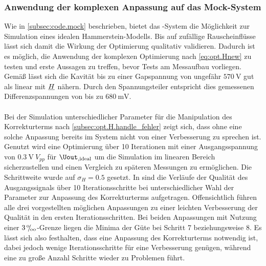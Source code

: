 \documentclass[../Report.tex]{subfiles}
\begin{document}
\subsubsection{Anwendung der komplexen Anpassung auf das Mock-System}
\label{subsubsec:opt.H.mock_simulation}

Wie in \ref{subsec:code.mock} beschrieben, bietet das \mock-System die Möglichkeit zur Simulation eines idealen Hammerstein-Modells. Bis auf zufällige Rauscheinflüsse lässt sich damit die Wirkung der Optimierung qualitativ validieren.
Dadurch ist es möglich, die Anwendung der komplexen Optimierung nach \eqref{eq:opt.Hnew} zu testen und erste Aussagen zu treffen, bevor Tests am Messaufbau vorliegen.
Gemäß \cite{gross17} lässt sich die Kavität bis zu einer Gapspannung von ungefähr $\SI{570}{\volt}$ gut als linear mit $\underline{H}$ nähern. Durch den Spannungsteiler entspricht dies gemessenen Differenzspannungen von bis zu $\SI{680}{\milli\volt}$.
\\
\\
Bei der Simulation unterschiedlicher Parameter für die Manipulation des Korrekturterms nach \ref{subsec:opt.H.handle_fehler} zeigt sich, dass ohne eine solche Anpassung bereits im \mock System nicht von einer Verbesserung zu sprechen ist.
Genutzt wird eine Optimierung über 10 Iterationen mit einer Ausgangsspannung von $\SI{0.3}{\volt} ~ V_{pp}$ für $\Uout_{, \mathrm{ideal}}$ um die Simulation im linearen Bereich sicherzustellen und einen Vergleich zu späteren Messungen zu ermöglichen. Die Schrittweite wurde auf $\sigma_H = 0.5$ gesetzt.
In  sind die Verläufe der Qualität des Ausgangssignals über 10 Iterationsschritte bei unterschiedlicher Wahl der Parameter zur Anpassung des Korrekturterms aufgetragen. Offensichtlich führen alle drei vorgestellten möglichen Anpassungen zu einer leichten Verbesserung der Qualität in den ersten Iterationsschritten. Bei beiden Anpassungen mit Nutzung einer $3 \, {}^\text{o}\mkern-5mu/\mkern-3mu_\text{oo}$-Grenze liegen die Minima der Güte bei Schritt 7 beziehungsweise 8. 
Es lässt sich also festhalten, dass eine Anpassung des Korrekturterms notwendig ist, dabei jedoch wenige Iterationsschritte für eine Verbesserung genügen, während eine zu große Anzahl Schritte wieder zu Problemen führt. 

 \qualitySimple
{} \qualityThreePerm
{} \qualityAll
{} \qualityRMS
{} \qualityZeroPad
\end{document}
